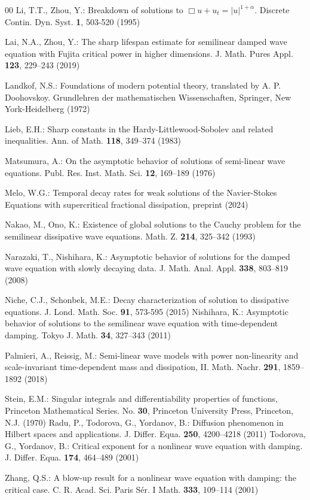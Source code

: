 \documentclass[11pt,reqno]{amsart}
\begin{document}
\begin{thebibliography}{00}
 Li, T.T., Zhou, Y.:  Breakdown of solutions to $\Box u + u_t = |u|^{1+\alpha}$. Discrete
Contin. Dyn. Syst. \textbf{1}, 503-520 (1995)

 Lai, N.A.,  Zhou, Y.: The sharp lifespan estimate for semilinear damped wave equation with Fujita critical power in higher dimensions. J. Math. Pures Appl. \textbf{123}, 229--243 (2019)

 Landkof, N.S.: Foundations of modern potential theory, translated by A. P. Doohovskoy. Grundlehren der mathematischen Wissenschaften, Springer, New York-Heidelberg (1972)

 Lieb, E.H.:  Sharp constants in the Hardy-Littlewood-Sobolev and related inequalities. Ann. of Math. \textbf{118}, 349--374 (1983)

 Matsumura, A.: On the asymptotic behavior of solutions of semi-linear wave equations. Publ. Res. Inst. Math. Sci. \textbf{12}, 169--189 (1976)

 Melo, W.G.: Temporal decay rates for weak solutions of the Navier-Stokes Equations with supercritical fractional dissipation, preprint (2024)


 Nakao, M., Ono, K.: Existence of global solutions to the Cauchy problem for the semilinear dissipative wave equations. Math. Z. \textbf{214}, 325--342 (1993)

 Narazaki, T., Nishihara, K.: Asymptotic behavior of solutions for the damped wave equation with slowly decaying data. J. Math. Anal. Appl. \textbf{338}, 803--819 (2008)

 Niche, C.J., Schonbek, M.E.: Decay characterization of solution to dissipative equations. J. Lond. Math. Soc. {\bf 91}, 573-595 (2015)
 Nishihara, K.: Asymptotic behavior of solutions to the semilinear wave equation with time-dependent damping. Tokyo J. Math. \textbf{34}, 327--343 (2011)

 Palmieri, A., Reissig, M.: Semi-linear wave models with power non-linearity and scale-invariant time-dependent mass and dissipation, II. Math. Nachr. \textbf{291}, 1859--1892 (2018)


 Stein, E.M.: Singular integrals and differentiability properties of functions, Princeton Mathematical Series. No. \textbf{30}, Princeton University Press, Princeton, N.J. (1970)
 Radu, P., Todorova, G., Yordanov, B.: Diffusion phenomenon in Hilbert spaces and applications. J. Differ.  Equa. {\bf250}, 4200–4218 (2011)
 Todorova, G., Yordanov, B.: Critical exponent for a nonlinear wave equation with damping. J. Differ. Equa. \textbf{174}, 464--489 (2001)

 Zhang, Q.S.: A blow-up result for a nonlinear wave equation with damping: the critical case. C. R. Acad. Sci. Paris S\'er. I Math. \textbf{333}, 109--114 (2001)


\end{thebibliography}
\end{document}
